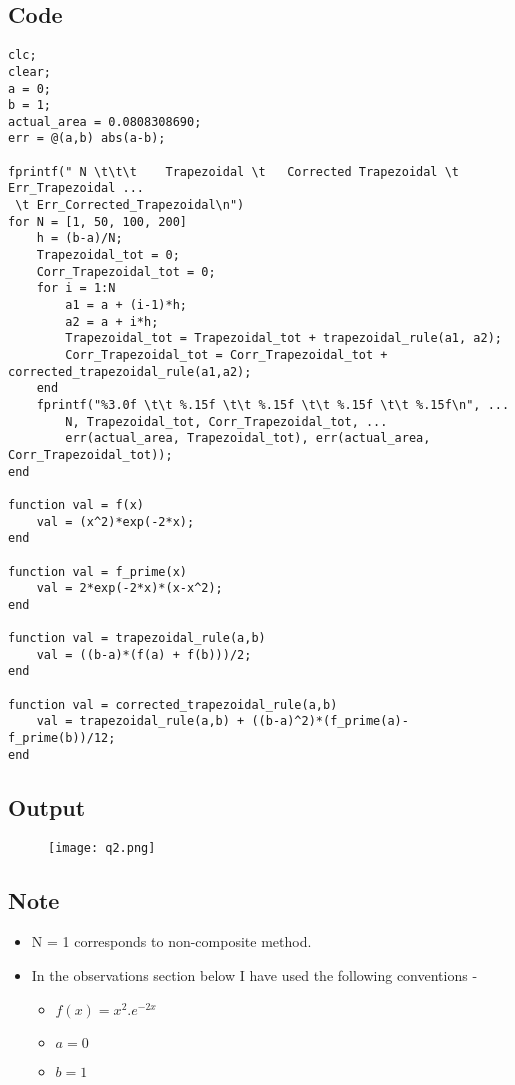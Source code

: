 \documentclass[12pt]{article}
\begin{document}
\subsection{Code}
\begin{verbatim}
clc;
clear;
a = 0;
b = 1;
actual_area = 0.0808308690;
err = @(a,b) abs(a-b);

fprintf(" N \t\t\t    Trapezoidal \t   Corrected Trapezoidal \t  Err_Trapezoidal ...
 \t Err_Corrected_Trapezoidal\n")
for N = [1, 50, 100, 200]
    h = (b-a)/N;
    Trapezoidal_tot = 0;
    Corr_Trapezoidal_tot = 0;
    for i = 1:N
        a1 = a + (i-1)*h;
        a2 = a + i*h;
        Trapezoidal_tot = Trapezoidal_tot + trapezoidal_rule(a1, a2);
        Corr_Trapezoidal_tot = Corr_Trapezoidal_tot + corrected_trapezoidal_rule(a1,a2);
    end
    fprintf("%3.0f \t\t %.15f \t\t %.15f \t\t %.15f \t\t %.15f\n", ...
        N, Trapezoidal_tot, Corr_Trapezoidal_tot, ...
        err(actual_area, Trapezoidal_tot), err(actual_area, Corr_Trapezoidal_tot));
end

function val = f(x)
    val = (x^2)*exp(-2*x);
end

function val = f_prime(x)
    val = 2*exp(-2*x)*(x-x^2);
end

function val = trapezoidal_rule(a,b)
    val = ((b-a)*(f(a) + f(b)))/2;
end

function val = corrected_trapezoidal_rule(a,b)
    val = trapezoidal_rule(a,b) + ((b-a)^2)*(f_prime(a)-f_prime(b))/12;
end
\end{verbatim}

\subsection{Output}
\begin{figure}[H]
\centering
\texttt{[image: q2.png]}
\end{figure}

\subsection{Note}
\begin{itemize}
	\item N = 1 corresponds to non-composite method.
	\item In the observations section below I have used the following conventions - 
	\begin{itemize}
		\item $f(x) = x^2.e^{-2x}$
		\item $a = 0$
		\item $b = 1$
	\end{itemize}
\end{itemize}
\end{document}
